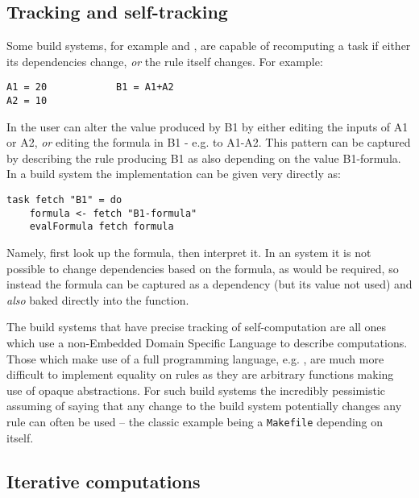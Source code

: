 \subsection{Tracking and self-tracking}\label{sec-tracking-aspects}

Some build systems, for example \Excel and \Ninja, are capable of recomputing a task if either its dependencies change, \textit{or} the rule itself changes. For example:

\begin{verbatim}
A1 = 20            B1 = A1+A2
A2 = 10
\end{verbatim}

In \Excel the user can alter the value produced by \textsf{B1} by either editing the inputs of \textsf{A1} or \textsf{A2}, \textit{or} editing the formula in \textsf{B1} - e.g. to \textsf{A1-A2}. This pattern can be captured by describing the rule producing \textsf{B1} as also depending on the value \textsf{B1-formula}. In a  build system the implementation can be given very directly as:

\begin{verbatim}
task fetch "B1" = do
    formula <- fetch "B1-formula"
    evalFormula fetch formula
\end{verbatim}

Namely, first look up the formula, then interpret it. In an  system it is not possible to change dependencies based on the formula, as would be required, so instead the formula can be captured as a dependency (but its value not used) and \textit{also} baked directly into the  function.

The build systems that have precise tracking of self-computation are all ones which use a non-Embedded Domain Specific Language to describe computations. Those which make use of a full programming language, e.g. \Shake, are much more difficult to implement equality on rules as they are arbitrary functions making use of opaque abstractions. For such build systems the incredibly pessimistic assuming of saying that any change to the build system potentially changes any rule can often be used -- the classic example being a \texttt{Makefile} depending on itself.

\subsection{Iterative computations}\label{sec-iterative-compute}

